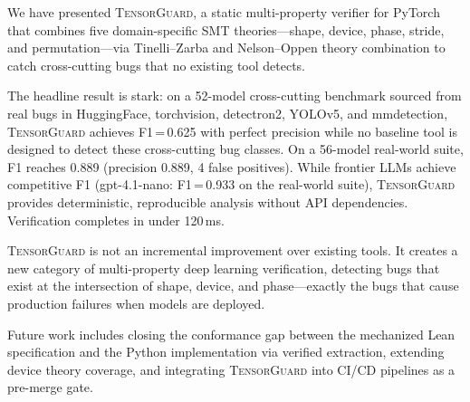 \documentclass[10pt]{article}
\newcommand{\tguard}{\textsc{TensorGuard}}
\theoremstyle{plain}
\theoremstyle{definition}
\theoremstyle{remark}
\begin{document}
We have presented \tguard{}, a static multi-property verifier for
PyTorch that combines five domain-specific SMT theories---shape,
device, phase, stride, and permutation---via Tinelli--Zarba and
Nelson--Oppen theory combination to catch cross-cutting bugs that
no existing tool detects.

The headline result is stark: on a 52-model cross-cutting benchmark
sourced from real bugs in HuggingFace, torchvision, detectron2,
YOLOv5, and mmdetection, \tguard{} achieves F1\,=\,0.625 with
perfect precision while no baseline tool is designed to detect
these cross-cutting bug classes.  On a 56-model real-world
suite, F1 reaches 0.889 (precision 0.889, 4 false positives).
While frontier LLMs achieve competitive F1 (gpt-4.1-nano:
F1\,=\,0.933 on the real-world suite), \tguard{} provides
deterministic, reproducible analysis without API dependencies.
Verification completes in under 120\,ms.

\tguard{} is not an incremental improvement over existing tools.
It creates a new category of multi-property deep learning
verification, detecting bugs that exist at the intersection of
shape, device, and phase---exactly the bugs that cause production
failures when models are deployed.

Future work includes closing the conformance gap between the
mechanized Lean specification and the Python implementation via
verified extraction, extending device theory coverage, and
integrating \tguard{} into CI/CD pipelines as a pre-merge gate.
\end{document}
